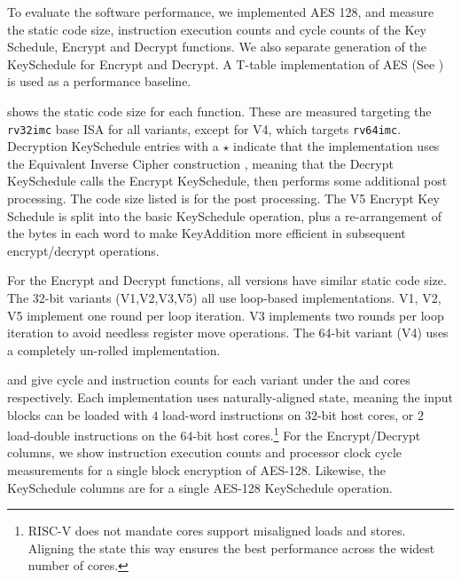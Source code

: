 
To evaluate the software performance, we implemented AES 128, and
measure the static code size, instruction execution counts and cycle
counts of the Key Schedule, Encrypt and Decrypt functions.
We also separate generation of the KeySchedule for Encrypt and Decrypt.
A T-table implementation of AES (See )
is used as a performance baseline.

 shows the static code size for each
function.
These are measured targeting the {\tt rv32imc} base ISA for all variants,
except for V4, which targets {\tt rv64imc}.
Decryption KeySchedule entries with a $\star$ indicate that the
implementation uses the Equivalent Inverse Cipher construction
\cite[Section 5.3.5, Page 23]{FIPS:197}, meaning that the
Decrypt KeySchedule calls the Encrypt KeySchedule, then performs some
additional post processing. The code size listed is for the post processing.
The V5 Encrypt Key Schedule is split into the basic KeySchedule
operation, plus a re-arrangement of the bytes in each word to make
KeyAddition more efficient in subsequent encrypt/decrypt operations.

For the Encrypt and Decrypt functions, all versions have similar
static code size.
The 32-bit variants (V1,V2,V3,V5) all use loop-based implementations.
V1, V2, V5 implement one round per loop iteration. V3 implements two
rounds per loop iteration to avoid needless register move operations.
The 64-bit variant (V4) uses a completely un-rolled implementation.

and
give cycle and instruction counts for each
variant under the  and  cores respectively.
Each implementation uses naturally-aligned state, meaning the input blocks
can be loaded with $4$ load-word instructions on $32$-bit host cores,
or $2$ load-double instructions on the $64$-bit host cores.\footnote{
RISC-V does not mandate cores support misaligned loads and
stores. Aligning the state this way ensures the best performance across
the widest number of cores.}
For the Encrypt/Decrypt columns, we show instruction execution counts
and processor clock cycle measurements for a single block
encryption of AES-128.
Likewise, the KeySchedule columns are for a single AES-128 KeySchedule
operation.

